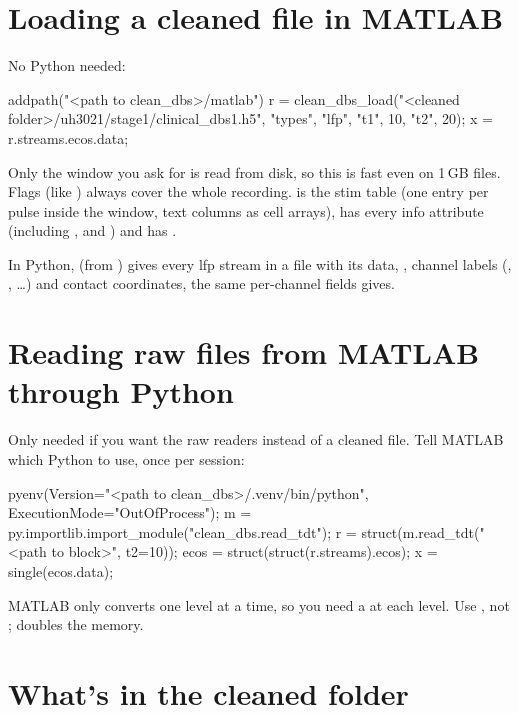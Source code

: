 \section{Loading a cleaned file in MATLAB}

No Python needed:
\begin{codebox}
addpath("<path to clean_dbs>/matlab")
r = clean_dbs_load("<cleaned folder>/uh3021/stage1/clinical_dbs1.h5", "types", {"lfp"}, "t1", 10, "t2", 20);
x = r.streams.ecos.data;     %
\end{codebox}
Only the window you ask for is read from disk, so this is fast even on 1\,GB files. Flags (like ) always cover the whole recording.  is the stim table (one entry per pulse inside the window, text columns as cell arrays),  has every info attribute (including ,  and ) and  has .

In Python,  (from ) gives every lfp stream in a file with its data, , channel labels (, , \ldots) and contact coordinates, the same per-channel fields  gives.

\section{Reading raw files from MATLAB through Python}

Only needed if you want the raw readers instead of a cleaned file. Tell MATLAB which Python to use, once per session:
\begin{codebox}
pyenv(Version="<path to clean_dbs>/.venv/bin/python", ExecutionMode="OutOfProcess");
m = py.importlib.import_module("clean_dbs.read_tdt");
r = struct(m.read_tdt("<path to block>", t2=10));
ecos = struct(struct(r.streams).ecos);
x = single(ecos.data);       %
\end{codebox}
MATLAB only converts one level at a time, so you need a  at each level. Use , not ;  doubles the memory.

\section{What's in the cleaned folder}


